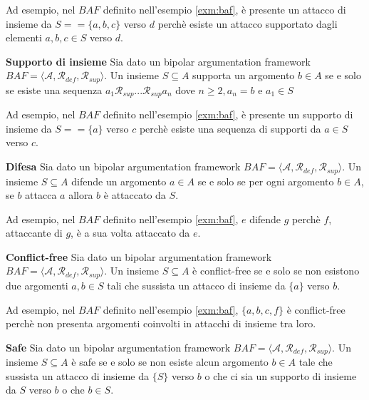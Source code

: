 Ad esempio, nel $BAF$ definito nell'esempio \ref{exm:baf}, è presente un attacco di insieme da $S = =\{a, b, c\}$ verso $d$ perchè esiste un attacco supportato dagli elementi $a, b, c \in S$ verso $d$.


\bigskip
\begin{defn} \textbf{Supporto di insieme} 
Sia dato un bipolar argumentation framework $BAF = ⟨\mathcal{A}, \mathcal{R}_{def}, \mathcal{R}_{sup}⟩$. Un insieme $S \subseteq A$ supporta un argomento $b \in A$ se e solo se esiste una sequenza $a_{1}\mathcal{R}_{sup}...\mathcal{R}_{sup}a_{n}$ dove $n \geq 2, a_n = b$ e $a_1 \in S$
\label{defn:sdibaf}
\end{defn}

Ad esempio, nel $BAF$ definito nell'esempio \ref{exm:baf}, è presente un supporto di insieme da $S = =\{a\}$ verso $c$ perchè esiste una sequenza di supporti da $a \in S$ verso $c$.


\bigskip
\begin{defn} \textbf{Difesa} 
Sia dato un bipolar argumentation framework $BAF = ⟨\mathcal{A}, \mathcal{R}_{def}, \mathcal{R}_{sup}⟩$. Un insieme $S \subseteq A$ difende un argomento $a \in A$ se e solo se per ogni argomento $b \in A$, se $b$ attacca $a$ allora $b$ è attaccato da $S$.
\label{defn:dbaf}
\end{defn}

Ad esempio, nel $BAF$ definito nell'esempio \ref{exm:baf}, $e$ difende $g$ perchè $f$, attaccante di $g$, è a sua volta attaccato da $e$.


\bigskip
\begin{defn} \textbf{Conflict-free} 
Sia dato un bipolar argumentation framework $BAF = ⟨\mathcal{A}, \mathcal{R}_{def}, \mathcal{R}_{sup}⟩$. Un insieme $S \subseteq A$ è conflict-free se e solo se non esistono due argomenti $a, b \in S$ tali che sussista un attacco di insieme da $\{a\}$ verso $b$.
\end{defn}

Ad esempio, nel $BAF$ definito nell'esempio \ref{exm:baf}, $\{a, b, c, f\}$ è conflict-free perchè non presenta argomenti coinvolti in attacchi di insieme tra loro.


\bigskip
\begin{defn} \textbf{Safe} 
Sia dato un bipolar argumentation framework $BAF = ⟨\mathcal{A}, \mathcal{R}_{def}, \mathcal{R}_{sup}⟩$. Un insieme $S \subseteq A$ è safe se e solo se non esiste alcun argomento $b \in A$ tale che sussista un attacco di insieme da $\{S\}$ verso $b$ o che ci sia un supporto di insieme da $S$ verso $b$ o che $b \in S$. 
\end{defn}

